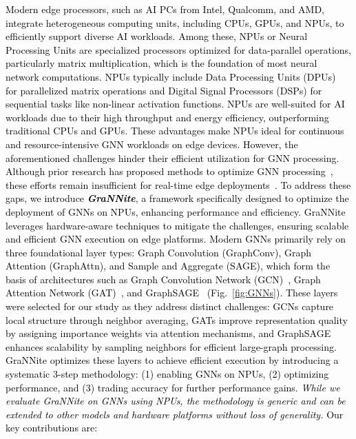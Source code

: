 \textcolor{black}{Modern edge processors, such as AI PCs from Intel, Qualcomm, and AMD, integrate heterogeneous computing units, including CPUs, GPUs, and NPUs, to efficiently support diverse AI workloads. Among these, NPUs or Neural Processing Units are specialized processors optimized for data-parallel operations, particularly matrix multiplication, which is the foundation of most neural network computations. NPUs typically include Data Processing Units (DPUs)~\cite{flexnn} for parallelized matrix operations and Digital Signal Processors (DSPs) for sequential tasks like non-linear activation functions.
NPUs are well-suited for AI workloads due to their high throughput and energy efficiency, outperforming traditional CPUs and GPUs. These advantages make NPUs ideal for continuous and resource-intensive GNN workloads on edge devices. However, the aforementioned challenges hinder their efficient utilization for GNN processing.
Although prior research has proposed methods to optimize GNN processing~\cite{gcn_point_cloud}, these efforts remain insufficient for real-time edge deployments~\cite{gnn_edge_1, gnn_fpga}. To address these gaps, we introduce \textbf{\textit{GraNNite}}, a framework specifically designed to optimize the deployment of GNNs on NPUs, enhancing performance and efficiency. GraNNite leverages hardware-aware techniques to mitigate the challenges, ensuring scalable and efficient GNN execution on edge platforms.}
\textcolor{black}{Modern GNNs primarily rely on three foundational layer types: Graph Convolution (GraphConv), Graph Attention (GraphAttn), and Sample and Aggregate (SAGE), which form the basis of architectures such as Graph Convolution Network (GCN)~\cite{gcn}, Graph
Attention Network (GAT)~\cite{gat}, and GraphSAGE~\cite{sage} (Fig.~\ref{fig:GNNs}). These layers were selected for our study as they address distinct challenges: GCNs capture local structure through neighbor averaging, GATs improve representation quality by assigning importance weights via attention mechanisms, and GraphSAGE enhances scalability by sampling neighbors for efficient large-graph processing. GraNNite optimizes these layers to achieve efficient execution by introducing a systematic 3-step methodology: (1) enabling GNNs on NPUs, (2) optimizing performance, and (3) trading accuracy for further performance gains. \textit{While we evaluate GraNNite on GNNs using NPUs, the methodology is generic and can be extended to other models and hardware platforms without loss of generality.} Our key contributions are:}

